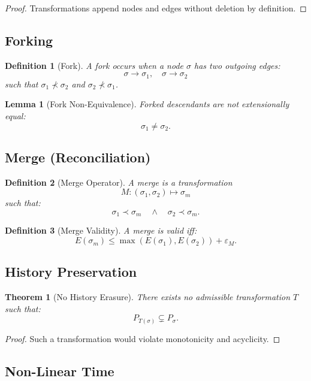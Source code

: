\documentclass[11pt]{article}
\newtheorem{definition}{Definition}
\newtheorem{theorem}{Theorem}
\newtheorem{lemma}{Lemma}
\begin{document}
\begin{proof}
Transformations append nodes and edges without deletion by definition.
\end{proof}

\subsection{Forking}

\begin{definition}[Fork]
A fork occurs when a node $\sigma$ has two outgoing edges:
\[
\sigma \to \sigma_1,\quad \sigma \to \sigma_2
\]
such that $\sigma_1 \not\prec \sigma_2$ and $\sigma_2 \not\prec \sigma_1$.
\end{definition}

\begin{lemma}[Fork Non-Equivalence]
Forked descendants are not extensionally equal:
\[
\sigma_1 \neq \sigma_2.
\]
\end{lemma}

\subsection{Merge (Reconciliation)}

\begin{definition}[Merge Operator]
A merge is a transformation
\[
M : (\sigma_1, \sigma_2) \mapsto \sigma_m
\]
such that:
\[
\sigma_1 \prec \sigma_m \quad \wedge \quad \sigma_2 \prec \sigma_m.
\]
\end{definition}

\begin{definition}[Merge Validity]
A merge is valid iff:
\[
E(\sigma_m) \le \max(E(\sigma_1), E(\sigma_2)) + \varepsilon_M.
\]
\end{definition}

\subsection{History Preservation}

\begin{theorem}[No History Erasure]
There exists no admissible transformation $T$ such that:
\[
P_{T(\sigma)} \subsetneq P_\sigma.
\]
\end{theorem}

\begin{proof}
Such a transformation would violate monotonicity and acyclicity.
\end{proof}

\subsection{Non-Linear Time}
\end{document}
